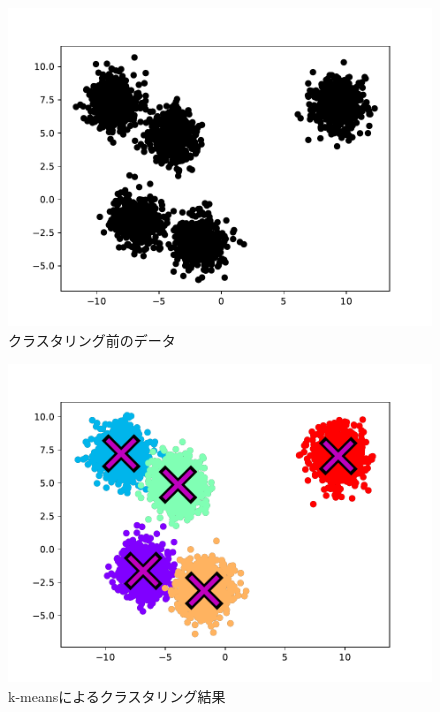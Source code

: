 \documentclass[10pt,a4j,twocolumn]{ltjsarticle}
\begin{document}
\begin{figure}[htbp]
  \begin{center}
    \includegraphics[width=0.8\linewidth]{img/k-means/before.pdf}
    \caption{クラスタリング前のデータ}
    \label{img:kmeans-before}
  \end{center}
\end{figure}
\begin{figure}[htbp]
  \begin{center}
    \includegraphics[width=0.8\linewidth]{img/k-means/after.pdf}
    \caption{k-meansによるクラスタリング結果}
    \label{img:kmeans-after}
  \end{center}
\end{figure}
\end{document}
